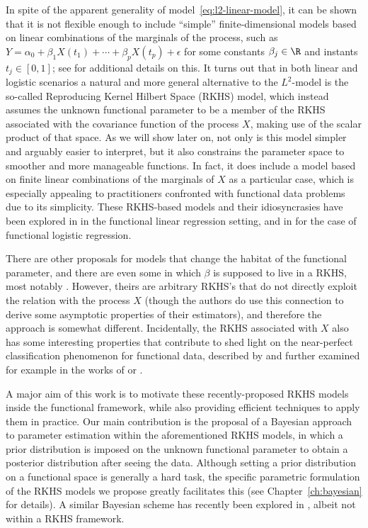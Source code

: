 In spite of the apparent generality of model~\eqref{eq:l2-linear-model}, it can be shown that it is not flexible enough to include ``simple'' finite-dimensional models based on linear combinations of the marginals of the process, such as \(Y=\alpha_0 + \beta_1 X(t_1)+ \cdots + \beta_p X(t_p) + \epsilon\) for some constants \(\beta_j\in\R\) and instants \(t_j\in[0,1]\); see \citet{berrendero2020general} for additional details on this. It turns out that in both linear and logistic scenarios a natural and more general alternative to the \(L^2\)-model is the so-called Reproducing Kernel Hilbert Space (RKHS) model, which instead assumes the unknown functional parameter to be a member of the RKHS associated with the covariance function of the process \(X\), making use of the scalar product of that space. As we will show later on, not only is this model simpler and arguably easier to interpret, but it also constrains the parameter space to smoother and more manageable functions. In fact, it does include a model based on finite linear combinations of the marginals of \(X\) as a particular case, which is especially appealing to practitioners confronted with functional data problems due to its simplicity. These RKHS-based models and their idiosyncrasies have been explored in \citet{berrendero2019rkhs, berrendero2020general} in the functional linear regression setting, and in \citet{berrendero2023functional} for the case of functional logistic regression.

There are other proposals for models that change the habitat of the functional parameter, and there are even some in which \(\beta\) is supposed to live in a RKHS, most notably \citet{yuan2010reproducing}. However, theirs are arbitrary RKHS's that do not directly exploit the relation with the process \(X\) (though the authors do use this connection to derive some asymptotic properties of their estimators), and therefore the approach is somewhat different. Incidentally, the RKHS associated with \(X\) also has some interesting properties that contribute to shed light on the near-perfect classification phenomenon for functional data, described by \citet{delaigle2012achieving} and further examined for example in the works of \citet{berrendero2018use} or \citet{torrecilla2020optimal}.

A major aim of this work is to motivate these recently-proposed RKHS models inside the functional framework, while also providing efficient techniques to apply them in practice. Our main contribution is the proposal of a Bayesian approach to parameter estimation within the aforementioned RKHS models, in which a prior distribution is imposed on the unknown functional parameter to obtain a posterior distribution after seeing the data. Although setting a prior distribution on a functional space is generally a hard task, the specific parametric formulation of the RKHS models we propose greatly facilitates this (see Chapter~\ref{ch:bayesian} for details). A similar Bayesian scheme has recently been explored in \citet{grollemund2019bayesian}, albeit not within a RKHS framework.

